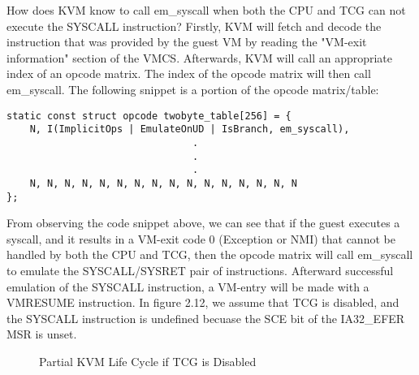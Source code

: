 \documentclass{report}
\begin{document}
\begin{spacing}{1.5}
{\large
\noindent How does KVM know to call em\_syscall when both the CPU and TCG can not execute the SYSCALL instruction? Firstly, KVM will fetch and decode the instruction that was provided by the guest VM by reading the "VM-exit information" section of the VMCS. Afterwards, KVM will call an appropriate index of an opcode matrix. The index of the opcode matrix will then call em\_syscall. The following snippet is a portion of the opcode matrix/table:
\newline
}





\begin{lstlisting}[caption={/arch/x86/kvm/emulate.c:2712 | Linux kernel V5.18.8},captionpos=b]
static const struct opcode twobyte_table[256] = {
    N, I(ImplicitOps | EmulateOnUD | IsBranch, em_syscall),
                                .
                                .
                                .
    N, N, N, N, N, N, N, N, N, N, N, N, N, N, N, N
};
\end{lstlisting}

{\large
\noindent From observing the code snippet above, we can see that if the guest executes a syscall, and it results in a VM-exit code 0 (Exception or NMI) that cannot be handled by both the CPU and TCG, then the opcode matrix will call em\_syscall to emulate the SYSCALL/SYSRET pair of instructions. Afterward successful emulation of the SYSCALL instruction, a VM-entry will be made with a VMRESUME instruction. In figure 2.12, we assume that TCG is disabled, and the SYSCALL instruction is undefined becuase the SCE bit of the IA32\_EFER MSR is unset.
\leavevmode\newline
}

{}
\begin{figure}[ht]
    \centering
    \caption{Partial KVM Life Cycle if TCG is Disabled}
\end{figure}





\end{spacing}
\end{document}
